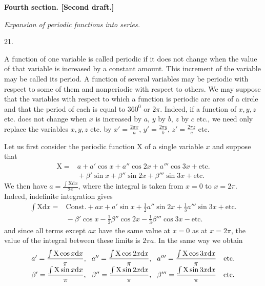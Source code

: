 \par{}\bigskip
{}
\begin{center}{\large\bfseries Fourth section. [Second draft.]\par}\medskip
\textit{Expansion of periodic functions into series.}\end{center}
\begin{center}21.\end{center}
\begingroup
\noindent\hspace*{\parindent}A function of one variable is called periodic if it does not change when the value of that variable is increased by a constant amount. This increment of the variable may be called its period. A function of several variables may be periodic with respect to some of them and nonperiodic with respect to others. We may suppose that the variables with respect to which a function is periodic are arcs of a circle and that the period of each is equal to \(360^0\) or \(2\pi\). Indeed, if a function of \(x,y,z\) etc. does not change when \(x\) is increased by \(a\), \(y\) by \(b\), \(z\) by \(c\) etc., we need only replace the variables \(x,y,z\) etc. by \(x'=\frac{2\pi x}{a}\), \(y'=\frac{2\pi y}{b}\), \(z'=\frac{2\pi z}{c}\) etc.
\par
Let us first consider the periodic function \(\mathrm{X}\) of a single variable \(x\) and suppose that
\[
\begin{aligned}
\mathrm{X}={}&a+a'\cos x+a''\cos2x+a'''\cos3x+\text{etc.}\\
&{}+\beta'\sin x+\beta''\sin2x+\beta'''\sin3x+\text{etc.}
\end{aligned}
\]
\noindent{}We then have \(a=\frac{\int\mathrm{X}\mathrm{d}x}{2\pi}\), where the integral is taken from \(x=0\) to \(x=2\pi\). Indeed, indefinite integration gives
\[
\begin{aligned}
\int\mathrm{X}\mathrm{d}x={}&\text{Const.}+ax+a'\sin x+\tfrac12a''\sin2x+\tfrac13a'''\sin3x+\text{etc.}\\
&{}-\beta'\cos x-\tfrac12\beta''\cos2x-\tfrac13\beta'''\cos3x-\text{etc.}
\end{aligned}
\]
\noindent and since all terms except \(ax\) have the same value at \(x=0\) as at \(x=2\pi\), the value of the integral between these limits is \(2\pi a\). In the same way we obtain
\[
\setlength{\arraycolsep}{4pt}
\begin{array}{lll}
a'=\dfrac{\int\mathrm{X}\cos x\mathrm{d}x}{\pi},&a''=\dfrac{\int\mathrm{X}\cos2x\mathrm{d}x}{\pi},&a'''=\dfrac{\int\mathrm{X}\cos3x\mathrm{d}x}{\pi}\quad\text{etc.}\\[4pt]
\beta'=\dfrac{\int\mathrm{X}\sin x\mathrm{d}x}{\pi},&\beta''=\dfrac{\int\mathrm{X}\sin2x\mathrm{d}x}{\pi},&\beta'''=\dfrac{\int\mathrm{X}\sin3x\mathrm{d}x}{\pi}\quad\text{etc.}
\end{array}
\]
\par\endgroup
